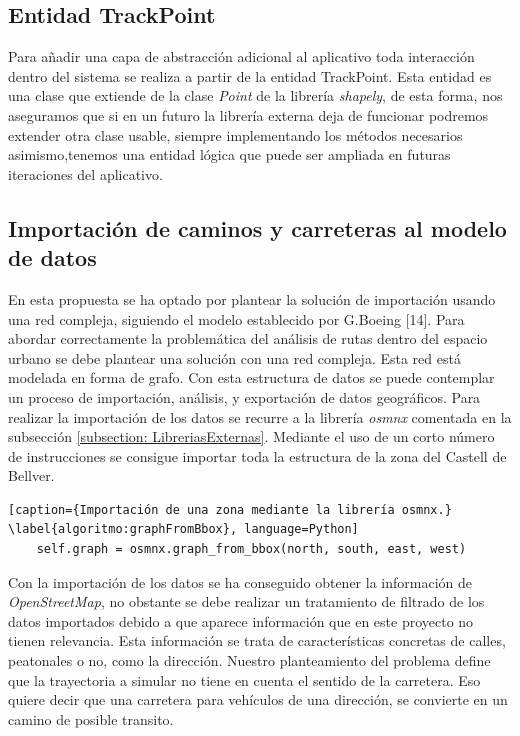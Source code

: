 \subsection{Entidad TrackPoint}
Para añadir una capa de abstracción adicional al aplicativo toda interacción dentro del 
sistema se realiza a partir de la entidad TrackPoint. Esta entidad es una clase que 
extiende de la clase \textit{Point} de la librería \textit{shapely}, de esta forma, nos 
aseguramos que si en un futuro la librería externa deja de funcionar podremos extender 
otra clase usable, siempre implementando los métodos necesarios asimismo,tenemos 
una entidad lógica que puede ser ampliada en futuras iteraciones del aplicativo.

\subsection{Importación de caminos y carreteras al modelo de datos}
\label{section: EstructuraLogica}
En esta propuesta se ha optado por plantear la solución de importación usando una red 
compleja, siguiendo el modelo establecido por G.Boeing [14]. Para abordar 
correctamente la problemática del análisis de rutas dentro del espacio urbano se debe 
plantear una solución con una red compleja. 
Esta red está modelada en forma de grafo. Con esta estructura de datos se puede 
contemplar un proceso de importación, análisis, y exportación de datos geográficos. 
Para realizar la importación de los datos se recurre a la librería \textit{osmnx} 
comentada en la subsección \ref{subsection: LibreriasExternas}. Mediante el uso de un 
corto número de instrucciones se consigue importar toda la estructura de la zona del 
Castell de Bellver.
\begin{lstlisting}[caption={Importación de una zona mediante la librería osmnx.}
\label{algoritmo:graphFromBbox}, language=Python] 
	self.graph = osmnx.graph_from_bbox(north, south, east, west)
\end{lstlisting}


Con la importación de los datos se ha conseguido obtener la información de 
\textit{OpenStreetMap}, no obstante se debe realizar un tratamiento de filtrado de los 
datos importados debido a que aparece información que en este proyecto no tienen 
relevancia. Esta información se trata de características concretas de calles, peatonales 
o no, como la dirección. Nuestro planteamiento del problema define que la trayectoria a 
simular no tiene en cuenta el sentido de la carretera. Eso quiere decir que una carretera 
para vehículos de una dirección, se convierte en un camino de posible transito. 

